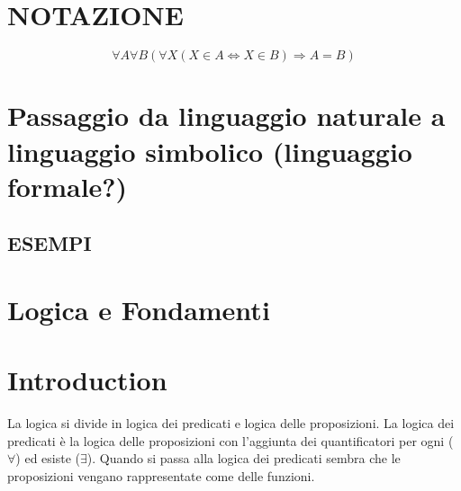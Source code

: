 \section{NOTAZIONE}
\[
  \forall A \forall B (\forall X (X \in A \Leftrightarrow X \in B ) \Rightarrow A = B)
\]




\section{Passaggio da linguaggio naturale a linguaggio simbolico (linguaggio formale?)}
\subsection{ESEMPI}



\section{Logica e Fondamenti}


\section{Introduction}
La logica si divide in logica dei predicati e logica delle proposizioni. La logica dei predicati è la logica delle proposizioni con l'aggiunta dei quantificatori
per ogni ($\forall$) ed esiste ($\exists$). Quando si passa alla logica dei predicati sembra che le proposizioni vengano rappresentate come delle funzioni. 

